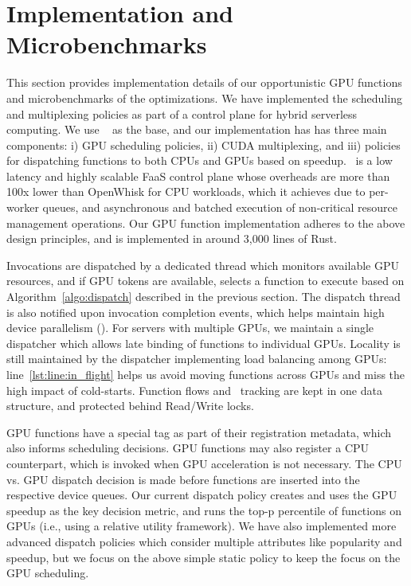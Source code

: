 \section{Implementation and Microbenchmarks}
\label{sec:impl}

This section provides implementation details of our opportunistic GPU functions and microbenchmarks of the optimizations. 
We have implemented the scheduling and multiplexing policies as part of a control plane for hybrid serverless computing.
We use \sysname~\cite{fuerst2023iluvatar} as the base, and our implementation has has three main components: i) GPU scheduling policies, ii) CUDA multiplexing, and iii) policies for dispatching functions to both CPUs and GPUs based on speedup.
\sysname~is a low latency and highly scalable FaaS control plane whose overheads are more than 100x lower than OpenWhisk for CPU workloads, which it achieves due to per-worker queues, and asynchronous and batched execution of non-critical resource management operations. 
Our GPU function implementation adheres to the above design principles, and is implemented in around 3,000 lines of Rust. 

Invocations are dispatched by a dedicated thread which monitors available GPU resources, and if GPU tokens are available, selects a function to execute based on Algorithm~\ref{algo:dispatch} described in the previous section.
The dispatch thread is also notified upon invocation completion events, which helps maintain high device parallelism (\D). 
For servers with multiple GPUs, we maintain a single dispatcher which allows late binding of functions to individual GPUs.
Locality is still maintained by the dispatcher implementing  load balancing among GPUs: line~\ref{lst:line:in_flight} helps us avoid moving functions across GPUs and miss the high impact of cold-starts.
Function flows and \VT~tracking are kept in one data structure, and protected behind Read/Write locks. 

GPU functions have a special  tag as part of their registration metadata, which also informs scheduling decisions.
GPU functions may also register a CPU counterpart, which is invoked when GPU acceleration is not necessary.
The CPU vs. GPU dispatch decision is made before functions are inserted into the respective device queues.
Our current dispatch policy creates and uses the GPU speedup as the key decision metric, and runs the top-p percentile of functions on GPUs (i.e., using a relative utility framework).
We have also implemented more advanced dispatch policies which consider multiple attributes like popularity and speedup, but we focus on the above simple static policy to keep the focus on the GPU scheduling. 


